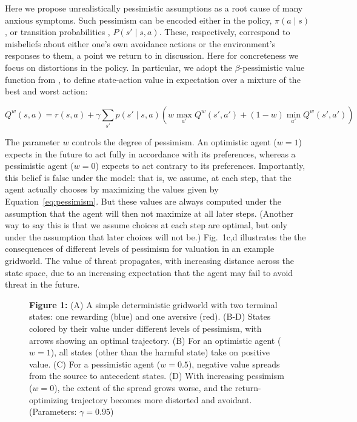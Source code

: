 \documentclass[11pt]{article} %
\begin{document}
Here we propose unrealistically pessimistic assumptions as a root cause of many anxious symptoms. Such pessimism can be encoded either in the policy, $\pi(a \mid s)$, or transition probabilities , $P(s' \mid s,a)$. These, respectively, correspond to misbeliefs about either one's own avoidance actions or the environment's responses to them, a point we return to in discussion. Here for concreteness we focus on distortions in the policy. In particular, we adopt the $\beta$-pessimistic value function from \cite{Gaskett2003}, to define state-action value in expectation over a mixture of the best and worst action:

\begin{equation}\label{eq:pessimism}
Q^w(s,a) = r(s,a) + \gamma \sum_{s'} p(s' \mid s,a) \left( w \max_{a'} Q^w(s',a') + (1 - w) \min_{a'} Q^w(s',a') \right)
\end{equation}

The parameter $w$ controls the degree of pessimism. An optimistic agent ($w = 1$) expects in the future to act fully in accordance with its preferences, whereas a pessimistic agent ($w = 0$) expects to act contrary to its preferences. Importantly, this belief is false under the model: that is, we assume, at each step, that the agent actually chooses by maximizing the values given by Equation~\ref{eq:pessimism}. But these values are always computed under the assumption that the agent will then not maximize at all later steps. (Another way to say this is that we assume choices at each step are optimal, but only under the assumption that later choices will not be.) Fig.~1c,d illustrates the the consequences of different levels of pessimism for valuation in an example gridworld. The value of threat propagates, with increasing distance across the state space, due to an increasing expectation that the agent may fail to avoid threat in the future.

\begin{figure}
  \centerline{%
  }
  \par \textbf{Figure 1:} (A) A simple deterministic gridworld with two terminal states: one rewarding (blue) and one aversive (red). (B-D) States colored by their value under different levels of pessimism, with arrows showing an optimal trajectory. (B) For an optimistic agent ($w=1$), all states (other than the harmful state) take on positive value. (C) For a pessimistic agent ($w=0.5$), negative value spreads from the source to antecedent states. (D) With increasing pessimism ($w=0$), the extent of the spread grows worse, and the return-optimizing trajectory becomes more distorted and avoidant. (Parameters: $\gamma = 0.95$)
\end{figure}
\end{document}
